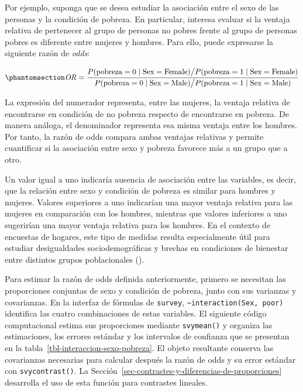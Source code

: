 \documentclass[
  spanish,
  11pt,
  letterpaper,
  oneside,
  open=any]{scrbook}
\begin{document}
Por ejemplo, suponga que se desea estudiar la asociación entre el sexo
de las personas y la condición de pobreza. En particular, interesa
evaluar si la ventaja relativa de pertenecer al grupo de personas no
pobres frente al grupo de personas pobres es diferente entre mujeres y
hombres. Para ello, puede expresarse la siguiente razón de \emph{odds}:

\begin{equation}\protect\phantomsection\label{eq-razon-odds}{
\mathit{OR} =
\frac{
P(\text{pobreza}=0 \mid \text{Sex}=\text{Female})
\big/
P(\text{pobreza}=1 \mid \text{Sex}=\text{Female})
}{
P(\text{pobreza}=0 \mid \text{Sex}=\text{Male})
\big/
P(\text{pobreza}=1 \mid \text{Sex}=\text{Male})
}
}\end{equation}

La expresión del numerador representa, entre las mujeres, la ventaja
relativa de encontrarse en condición de no pobreza respecto de
encontrarse en pobreza. De manera análoga, el denominador representa esa
misma ventaja entre los hombres. Por tanto, la razón de odds compara
ambas ventajas relativas y permite cuantificar si la asociación entre
sexo y pobreza favorece más a un grupo que a otro.

Un valor igual a uno indicaría ausencia de asociación entre las
variables, es decir, que la relación entre sexo y condición de pobreza
es similar para hombres y mujeres. Valores superiores a uno indicarían
una mayor ventaja relativa para las mujeres en comparación con los
hombres, mientras que valores inferiores a uno sugerirían una mayor
ventaja relativa para los hombres. En el contexto de encuestas de
hogares, este tipo de medidas resulta especialmente útil para estudiar
desigualdades sociodemográficas y brechas en condiciones de bienestar
entre distintos grupos poblacionales
().

Para estimar la razón de odds definida anteriormente, primero se
necesitan las proporciones conjuntas de sexo y condición de pobreza,
junto con sus varianzas y covarianzas. En la interfaz de fórmulas de
\texttt{survey}, \texttt{\textasciitilde{}interaction(Sex,\ poor)}
identifica las cuatro combinaciones de estas variables. El siguiente
código computacional estima sus proporciones mediante \texttt{svymean()}
y organiza las estimaciones, los errores estándar y los intervalos de
confianza que se presentan en la
tabla~\ref{tbl-interaccion-sexo-pobreza}. El objeto resultante conserva
las covarianzas necesarias para calcular después la razón de odds y su
error estándar con \texttt{svycontrast()}. La
Sección~\ref{sec-contrastes-y-diferencias-de-proporciones} desarrolla el
uso de esta función para contrastes lineales.
\end{document}
